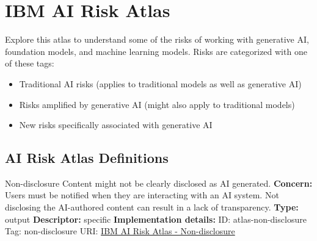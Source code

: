 \documentclass[a4paper,12pt]{article}
\begin{document}
\section{IBM AI Risk Atlas}
Explore this atlas to understand some of the risks of working with generative AI, foundation models, and machine learning models. Risks are categorized with one of these tags:
\begin{itemize}
\item Traditional AI risks (applies to traditional models as well as generative AI)
\item Risks amplified by generative AI (might also apply to traditional models)
\item New risks specifically associated with generative AI
\end{itemize}
\subsection*{AI Risk Atlas Definitions}
\begin{definitionbox}{Non-disclosure}
Content might not be clearly disclosed as AI generated.\newline\newline
\textbf{Concern: }Users must be notified when they are interacting with an AI system. Not disclosing the AI-authored content can result in a lack of transparency.\newline\newline
\textbf{Type: }output\newline
\textbf{Descriptor: }specific \newline\newline
\textbf{Implementation details: } \newline
ID: atlas-non-disclosure \newline
Tag: non-disclosure \newline
URI:  \href{https://www.ibm.com/docs/en/watsonx/saas?topic=SSYOK8/wsj/ai-risk-atlas/non-disclosure.html}{IBM AI Risk Atlas - Non-disclosure}\newline
\end{definitionbox}
\end{document}
